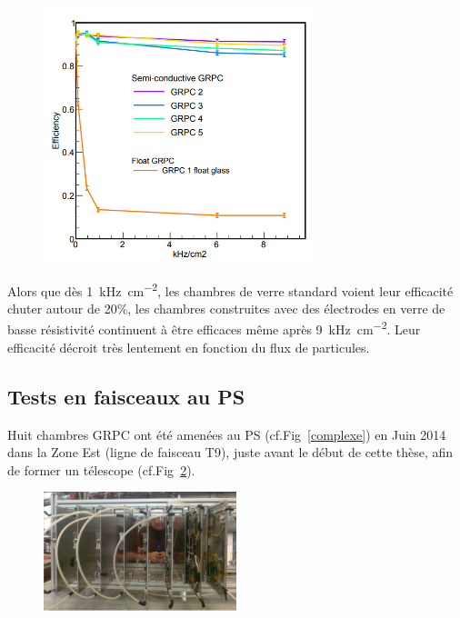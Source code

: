 \begin{figure}[ht!]
	\centering
	\includegraphics[width=0.7\textwidth]{GLA/effiDesy.png}
	\label{effiDesy}
\end{figure}

Alors que dès \SI{1}{\kilo\hertz\per\square\centi\meter}, les chambres de verre standard voient leur efficacité chuter autour de 20\%, les chambres construites avec des électrodes en verre de basse résistivité continuent à être efficaces même après \SI{9}{\kilo\hertz\per\square\centi\meter}. Leur efficacité décroit très lentement en fonction du flux de particules.

\subsection{Tests en faisceaux au PS}
Huit chambres GRPC ont été amenées au PS (cf.Fig~\ref{complexe}) en Juin \num{2014} dans la Zone Est (ligne de faisceau T9), juste avant le début de cette thèse, afin de former un télescope (cf.Fig~\ref{TelescopePS}).

\begin{figure}[ht!]
	\centering
	\includegraphics[width=0.50\textwidth]{GLA/TelescopePS.png}
	\label{TelescopePS}
\end{figure}

